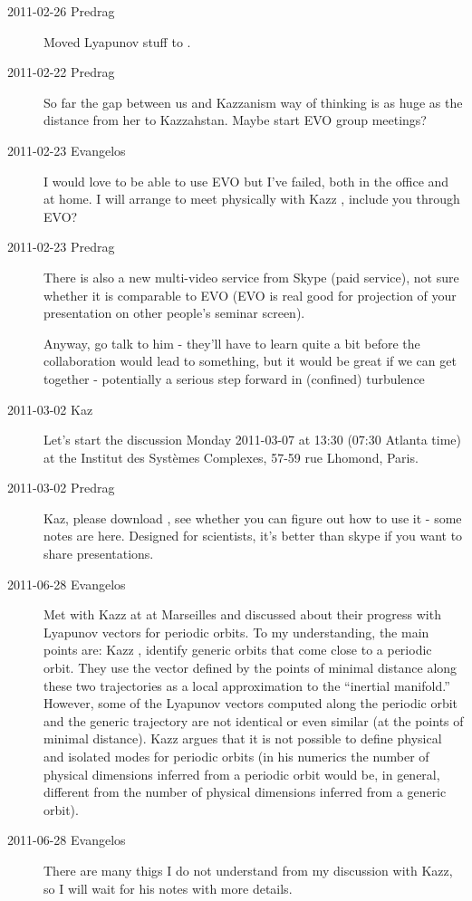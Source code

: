 \begin{description}

\item[2011-02-26 Predrag] Moved Lyapunov stuff to
    .


\item[2011-02-22 Predrag]
So far the gap between us and Kazzanism way of thinking is as huge
as the distance from her to Kazzahstan.
Maybe start EVO group meetings?

\item[2011-02-23 Evangelos]
I would love to be able to use EVO but I've
    failed, both in the office and at home. I will arrange to meet
    physically with Kazz \etal, include you
    through EVO?

\item[2011-02-23 Predrag]
There is also a new multi-video service from Skype (paid service), not
sure whether it is comparable to EVO (EVO is real good for projection of
your presentation on other people's seminar screen).

Anyway, go talk to him - they'll have to learn quite a bit before the
collaboration would lead to something, but it would be great if we can
get together - potentially a serious step forward in (confined)
turbulence

\item[2011-03-02 Kaz] Let's start the discussion
 Monday 2011-03-07 at 13:30 (07:30 Atlanta time) at the Institut des Syst\`emes Complexes, 57-59 rue Lhomond, Paris.

\item[2011-03-02 Predrag] Kaz, please download
, see whether you can
figure out how to use it - some notes are
{here}. Designed for scientists, it's better than skype if you want to
share presentations.

\item[2011-06-28 Evangelos] Met with Kazz at 
at Marseilles and discussed about their progress with Lyapunov vectors for
periodic orbits. To my understanding, the main points are: Kazz \etal, identify
generic orbits that come close to a periodic orbit. They use the vector defined
by the points of minimal distance along these two trajectories as a local approximation  
to the ``inertial manifold.'' However, some of the Lyapunov vectors computed along the periodic
orbit and the generic trajectory are not identical or even similar (at the points
of minimal distance). Kazz argues
that it is not possible to define physical and isolated modes for periodic orbits  
(in his numerics the number of physical dimensions inferred from a periodic orbit 
would be, in general, different from the number of physical dimensions inferred from
a generic orbit).

\item[2011-06-28 Evangelos] There are many thigs I do not understand from my discussion
with Kazz, so I will wait for his notes with more details.
 
\end{description}

\renewcommand{\ssp}{a}
